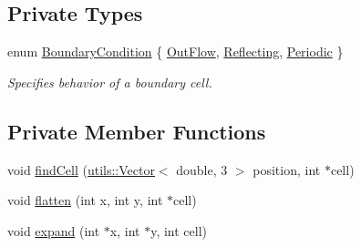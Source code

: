 \subsection*{Private Types}
\begin{DoxyCompactItemize}
\item 
enum \hyperlink{classSimulation_1_1ParticleContainer_a5e913177d570f1276e90e4d5c19029bd}{Boundary\-Condition} \{ \hyperlink{classSimulation_1_1ParticleContainer_a5e913177d570f1276e90e4d5c19029bda02c8f7e918ce61d7457aad6d5136de06}{Out\-Flow}, 
\hyperlink{classSimulation_1_1ParticleContainer_a5e913177d570f1276e90e4d5c19029bda38294f9ed6bccc27cb21a49dfd465383}{Reflecting}, 
\hyperlink{classSimulation_1_1ParticleContainer_a5e913177d570f1276e90e4d5c19029bda98c413bdf3bd391fb5e5cb15a13a1b7a}{Periodic}
 \}
\begin{DoxyCompactList}\small\item\em Specifies behavior of a boundary cell. \end{DoxyCompactList}\end{DoxyCompactItemize}
\subsection*{Private Member Functions}
\begin{DoxyCompactItemize}
\item 
void \hyperlink{classSimulation_1_1ParticleContainer_aafaf96d8f9cf6ee877b0e001f46e854a}{find\-Cell} (\hyperlink{classutils_1_1Vector}{utils\-::\-Vector}$<$ double, 3 $>$ position, int $\ast$cell)
\item 
void \hyperlink{classSimulation_1_1ParticleContainer_aa815ad7b798de3be1f1c35f1e979716d}{flatten} (int x, int y, int $\ast$cell)
\item 
void \hyperlink{classSimulation_1_1ParticleContainer_a3d88bfbe1dcd2857d9ca60e87e112090}{expand} (int $\ast$x, int $\ast$y, int cell)
\end{DoxyCompactItemize}
